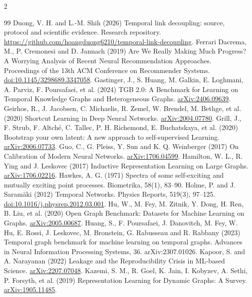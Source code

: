 \documentclass[a4paper,10pt,fleqn]{article}
\begin{document}
\begin{multicols}{2}
\begin{thebibliography}{99}
 Duong, V. H. and L.-M. Shih (2026) Temporal link decoupling: source, protocol and scientific evidence. Research repository. \url{https://github.com/hoangduong6210/temporal-link-decoupling}.
 Ferrari Dacrema, M., P. Cremonesi and D. Jannach (2019) Are We Really Making Much Progress? A Worrying Analysis of Recent Neural Recommendation Approaches. Proceedings of the 13th ACM Conference on Recommender Systems. \href{https://doi.org/10.1145/3298689.3347058}{doi:10.1145/3298689.3347058}.
 Gastinger, J., S. Huang, M. Galkin, E. Loghmani, A. Parviz, F. Poursafaei, et al. (2024) TGB 2.0: A Benchmark for Learning on Temporal Knowledge Graphs and Heterogeneous Graphs. \href{https://arxiv.org/abs/2406.09639}{arXiv:2406.09639}.
 Geirhos, R., J. Jacobsen, C. Michaelis, R. Zemel, W. Brendel, M. Bethge, et al. (2020) Shortcut Learning in Deep Neural Networks. \href{https://arxiv.org/abs/2004.07780}{arXiv:2004.07780}.
 Grill, J., F. Strub, F. Altché, C. Tallec, P. H. Richemond, E. Buchatskaya, et al. (2020) Bootstrap your own latent: A new approach to self-supervised Learning. \href{https://arxiv.org/abs/2006.07733}{arXiv:2006.07733}.
 Guo, C., G. Pleiss, Y. Sun and K. Q. Weinberger (2017) On Calibration of Modern Neural Networks. \href{https://arxiv.org/abs/1706.04599}{arXiv:1706.04599}.
 Hamilton, W. L., R. Ying and J. Leskovec (2017) Inductive Representation Learning on Large Graphs. \href{https://arxiv.org/abs/1706.02216}{arXiv:1706.02216}.
 Hawkes, A. G. (1971) Spectra of some self-exciting and mutually exciting point processes. Biometrika, 58(1), 83--90.
 Holme, P. and J. Saramäki (2012) Temporal Networks. Physics Reports, 519(3), 97--125. \href{https://doi.org/10.1016/j.physrep.2012.03.001}{doi:10.1016/j.physrep.2012.03.001}.
 Hu, W., M. Fey, M. Zitnik, Y. Dong, H. Ren, B. Liu, et al. (2020) Open Graph Benchmark: Datasets for Machine Learning on Graphs. \href{https://arxiv.org/abs/2005.00687}{arXiv:2005.00687}.
 Huang, S., F. Poursafaei, J. Danovitch, M. Fey, W. Hu, E. Rossi, J. Leskovec, M. Bronstein, G. Rabusseau and R. Rabbany (2023) Temporal graph benchmark for machine learning on temporal graphs. Advances in Neural Information Processing Systems, 36. arXiv:2307.01026.
 Kapoor, S. and A. Narayanan (2022) Leakage and the Reproducibility Crisis in ML-based Science. \href{https://arxiv.org/abs/2207.07048}{arXiv:2207.07048}.
 Kazemi, S. M., R. Goel, K. Jain, I. Kobyzev, A. Sethi, P. Forsyth, et al. (2019) Representation Learning for Dynamic Graphs: A Survey. \href{https://arxiv.org/abs/1905.11485}{arXiv:1905.11485}.

\end{thebibliography}
\end{multicols}
\end{document}
